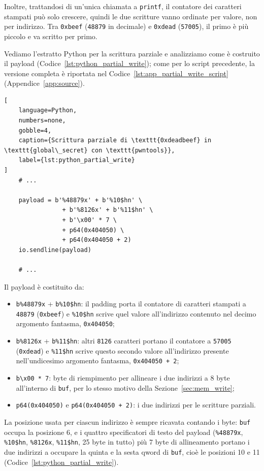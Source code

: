 Inoltre, trattandosi di un'unica chiamata a \texttt{printf}, il contatore dei caratteri stampati può solo crescere, quindi le due scritture vanno ordinate per valore, non per indirizzo. Tra \texttt{0xbeef} (\texttt{48879} in decimale) e \texttt{0xdead} (\texttt{57005}), il primo è più piccolo e va scritto per primo. 

Vediamo l'estratto Python per la scrittura parziale e analizziamo come è costruito il payload (Codice~\ref{lst:python_partial_write}); come per lo script precedente, la versione completa è riportata nel Codice~\ref{lst:app_partial_write_script} (Appendice~\ref{app:source}).
\begin{lstlisting}[
    language=Python,
    numbers=none,
    gobble=4,
    caption={Scrittura parziale di \texttt{0xdeadbeef} in \texttt{global\_secret} con \texttt{pwntools}},
    label={lst:python_partial_write}
]
    # ...

    payload = b'%48879x' + b'%10$hn' \
                + b'%8126x' + b'%11$hn' \
                + b'\x00' * 7 \
                + p64(0x404050) \
                + p64(0x404050 + 2)
    io.sendline(payload)

    # ...
\end{lstlisting}
Il payload è costituito da:
\begin{itemize}
    \item \texttt{b\textquotesingle\%48879x\textquotesingle} + \texttt{b\textquotesingle\%10\$hn\textquotesingle}: il padding porta il contatore di caratteri stampati a \texttt{48879} (\texttt{0xbeef}) e \texttt{\%10\$hn} scrive quel valore all'indirizzo contenuto nel decimo argomento fantasma, \texttt{0x404050};
    \item \texttt{b\textquotesingle\%8126x\textquotesingle} + \texttt{b\textquotesingle\%11\$hn\textquotesingle}: altri \texttt{8126} caratteri portano il contatore a \texttt{57005} (\texttt{0xdead}) e \texttt{\%11\$hn} scrive questo secondo valore all'indirizzo presente nell'undicesimo argomento fantasma, \texttt{0x404050 + 2};
    \item \texttt{b\textquotesingle\textbackslash{}x00\textquotesingle{} * 7}: byte di riempimento per allineare i due indirizzi a 8 byte all'interno di \texttt{buf}, per lo stesso motivo della Sezione~\ref{sec:mem_write};
    \item \texttt{p64(0x404050)} e \texttt{p64(0x404050 + 2)}: i due indirizzi per le scritture parziali.
\end{itemize}
La posizione usata per ciascun indirizzo è sempre ricavata contando i byte: \texttt{buf} occupa la posizione 6, e i quattro specificatori di testo del payload (\texttt{\%48879x}, \texttt{\%10\$hn}, \texttt{\%8126x}, \texttt{\%11\$hn}, 25 byte in tutto) più 7 byte di allineamento portano i due indirizzi a occupare la quinta e la sesta qword di \texttt{buf}, cioè le posizioni 10 e 11 (Codice~\ref{lst:python_partial_write}).

